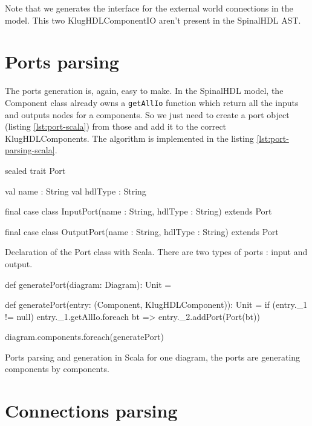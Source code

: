 Note that we generates the interface for the external world connections in the
model. This two KlugHDLComponentIO aren't present in the SpinalHDL AST.

\section{Ports parsing}
\label{sec:ports-parsing}

The ports generation is, again, easy to make. In the SpinalHDL model, the
Component class already owns a \verb|getAllIo| function which return all the
inputs and outputs nodes for a components. So we just need to create a port
object (listing \ref{lst:port-scala}) from those and add it to the correct
KlugHDLComponents. The algorithm is implemented in the listing
\ref{lst:port-parsing-scala}.

\begin{listing}[H]
  \centering
  \begin{scalacode}
  sealed trait Port {

    val name : String
    val hdlType : String
  }

  final case class InputPort(name : String, hdlType : String) extends Port

  final case class OutputPort(name : String, hdlType : String) extends Port
  \end{scalacode}
  \caption[Diagram class declaration]{Declaration of the Port class with Scala.
There are two types of ports : input and output.}
  \label{lst:port-scala}
\end{listing}

\begin{listing}[H]
  \centering
  \begin{scalacode}
  def generatePort(diagram: Diagram): Unit = {
    def generatePort(entry: (Component, KlugHDLComponent)): Unit = {
      if (entry._1 != null) {
        entry._1.getAllIo.foreach { bt =>
          entry._2.addPort(Port(bt))
        }
      }
    }

    diagram.components.foreach(generatePort)
  }
  \end{scalacode}
  \caption[Implementation of the ports parsing]{Ports parsing and generation in
    Scala for one diagram, the ports are generating components by components.}
  \label{lst:port-parsing-scala}
\end{listing}

\section{Connections parsing}
\label{sec:connections-parsing}


